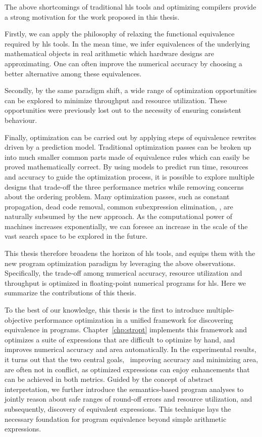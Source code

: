 The above shortcomings of traditional \gls{hls} tools and optimizing compilers
provide a strong motivation for the work proposed in this thesis.

Firstly, we can apply the philosophy of relaxing the functional equivalence
required by \gls{hls} tools.  In the mean time, we infer equivalences of the
underlying mathematical objects in real arithmetic which hardware designs are
approximating.  One can often improve the numerical accuracy by choosing a
better alternative among these equivalences.

Secondly, by the same paradigm shift, a wide range of optimization
opportunities can be explored to minimize throughput and resource utilization.
These opportunities were previously lost out to the necessity of ensuring
consistent behaviour.

Finally, optimization can be carried out by applying steps of equivalence
rewrites driven by a prediction model.  Traditional optimization passes can be
broken up into much smaller common parts made of equivalence rules which can
easily be proved mathematically correct.  By using models to predict run time,
resources and accuracy to guide the optimization process, it is possible to
explore multiple designs that trade-off the three performance metrics while
removing concerns about the ordering problem.  Many optimization passes, such
as constant propagation, dead code removal, common subexpression elimination,
\etc, are naturally subsumed by the new approach.  As the computational power
of machines increases exponentially, we can foresee an increase in the scale of
the vast search space to be explored in the future.

This thesis therefore broadens the horizon of \gls{hls} tools, and equips
them with the new program optimization paradigm by leveraging the above
observations.  Specifically, the trade-off among numerical accuracy, resource
utilization and throughput is optimized in floating-point numerical programs
for \gls{hls}\@.  Here we summarize the contributions of this thesis.

To the best of our knowledge, this thesis is the first to introduce
multiple-objective performance optimization in a unified framework for
discovering equivalence in programs.  Chapter~\ref{chp:stropt} implements this
framework and optimizes a suite of expressions that are difficult to optimize
by hand, and improves numerical accuracy and area automatically.  In the
experimental results, it turns out that the two central goals, \ie~improving
accuracy and minimizing area, are often not in conflict, as optimized
expressions can enjoy enhancements that can be achieved in both metrics.
Guided by the concept of abstract interpretation, we further introduce the
semantics-based program analyses to jointly reason about safe ranges of
round-off errors and resource utilization, and subsequently, discovery of
equivalent expressions.  This technique lays the necessary foundation for
program equivalence beyond simple arithmetic expressions.

